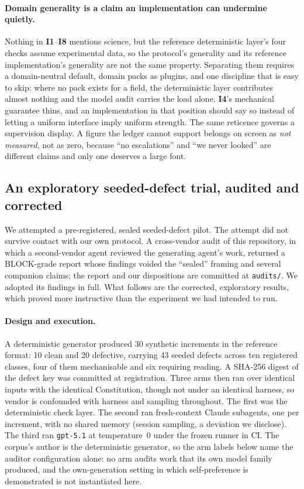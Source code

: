 \documentclass[11pt]{article}
\newcommand{\invariant}[1]{\textbf{I#1}}
\begin{document}
\paragraph{Domain generality is a claim an implementation can undermine quietly.} Nothing in \invariant{1}--\invariant{8} mentions science, but the reference deterministic layer's four checks assume experimental data, so the protocol's generality and its reference implementation's generality are not the same property. Separating them requires a domain-neutral default, domain packs as plugins, and one discipline that is easy to skip: where no pack exists for a field, the deterministic layer contributes almost nothing and the model audit carries the load alone. \invariant{4}'s mechanical guarantee thins, and an implementation in that position should say so instead of letting a uniform interface imply uniform strength. The same reticence governs a supervision display. A figure the ledger cannot support belongs on screen as \emph{not measured}, not as zero, because ``no escalations'' and ``we never looked'' are different claims and only one deserves a large font.

\subsection{An exploratory seeded-defect trial, audited and corrected}\label{sec:pilot}

We attempted a pre-registered, sealed seeded-defect pilot. The attempt did not survive contact with our own protocol. A cross-vendor audit of this repository, in which a second-vendor agent reviewed the generating agent's work, returned a BLOCK-grade report whose findings voided the ``sealed'' framing and several companion claims; the report and our dispositions are committed at \texttt{audits/}. We adopted its findings in full. What follows are the corrected, exploratory results, which proved more instructive than the experiment we had intended to run.

\paragraph{Design and execution.} A deterministic generator produced 30 synthetic increments in the reference format: 10 clean and 20 defective, carrying 43 seeded defects across ten registered classes, four of them mechanisable and six requiring reading. A SHA-256 digest of the defect key was committed at registration. Three arms then ran over identical inputs with the identical Constitution, though not under an identical harness, so vendor is confounded with harness and sampling throughout. The first was the deterministic check layer. The second ran fresh-context Claude subagents, one per increment, with no shared memory (session sampling, a deviation we disclose). The third ran \texttt{gpt-5.1} at temperature~0 under the frozen runner in CI. The corpus's author is the deterministic generator, so the arm labels below name the auditor configuration alone: no arm audits work that its own model family produced, and the own-generation setting in which self-preference is demonstrated \cite{panickssery2024} is not instantiated here.
\end{document}
